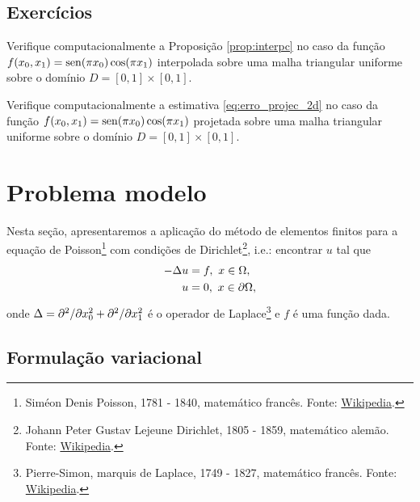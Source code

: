 \subsection{Exercícios}
\badgeRevisar

\begin{exer}
  Verifique computacionalmente a Proposição \ref{prop:interpc} no caso da função $f(x_0,x_1) = \operatorname{sen}(\pi x_0)\cos(\pi x_1)$ interpolada sobre uma malha triangular uniforme sobre o domínio $D = [0, 1]\times [0, 1]$.
\end{exer}

\begin{exer}
  Verifique computacionalmente a estimativa \eqref{eq:erro_projec_2d} no caso da função $f(x_0,x_1) = \operatorname{sen}(\pi x_0)\cos(\pi x_1)$ projetada sobre uma malha triangular uniforme sobre o domínio $D = [0, 1]\times [0, 1]$.
\end{exer}

\section{Problema modelo}\label{cap_mef2d_sec_probmodelo}
\badgeRevisar

Nesta seção, apresentaremos a aplicação do método de elementos finitos para a equação de Poisson\footnote{Siméon Denis Poisson, 1781 - 1840, matemático francês. Fonte: \href{https://en.wikipedia.org/wiki/Sim\%C3\%A9on_Denis_Poisson}{Wikipedia}.} com condições de Dirichlet\footnote{Johann Peter Gustav Lejeune Dirichlet, 1805 - 1859, matemático alemão. Fonte: \href{https://en.wikipedia.org/wiki/Peter_Gustav_Lejeune_Dirichlet}{Wikipedia}.}, i.e.: encontrar $u$ tal que
\begin{align}
  -\Delta u &= f,~x\in\Omega,\label{eq:mef2d_pm_eq}\\
  u &= 0,~x\in\partial\Omega,\label{eq:mef2d_pm_bc}
\end{align}
onde $\Delta = \partial^2/\partial x_0^2 + \partial^2/\partial x_1^2$ é o operador de Laplace\footnote{Pierre-Simon, marquis de Laplace, 1749 - 1827, matemático francês. Fonte: \href{https://en.wikipedia.org/wiki/Pierre-Simon_Laplace}{Wikipedia}.} e $f$ é uma função dada.

\subsection{Formulação variacional}
\badgeRevisar

